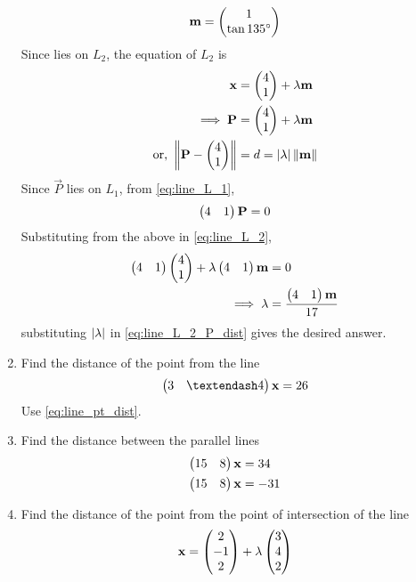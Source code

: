 \documentclass[journal,12pt,twocolumn]{IEEEtran}
\renewcommand\thesection{\arabic{section}}
\begin{document}
\begin{enumerate}[label=\thesection.\arabic*.,ref=\thesection.\theenumi]
\begin{align}
\mathbf{m} = \begin{pmatrix}1 \\ \tan 135\degree\end{pmatrix}
\end{align}
%
Since  lies on $L_2$, the equation of $L_2$ is 
\begin{align}
\label{eq:line_L_2}
\vec{x} &= \myvec{4\\1} + \lambda \vec{m} 
\\
\label{eq:line_L_2_P}
\implies \vec{P} &= \myvec{4\\1} + \lambda \vec{m} 
\\
\label{eq:line_L_2_P_dist}
\text{or, } \norm{\vec{P} - \myvec{4\\1}} &= d = \abs{\lambda}\norm{\vec{m} }
%
\end{align}
%
Since $\vec{P}$ lies on $L_1$, from \eqref{eq:line_L_1},
%
\begin{align}
\begin{pmatrix}4 & 1\end{pmatrix}\mathbf{P}  = 0
\end{align}
%
Substituting from the above in \eqref{eq:line_L_2},
%
\begin{align}
\begin{pmatrix}4 & 1\end{pmatrix}\begin{pmatrix}4\\1\end{pmatrix} + \lambda \begin{pmatrix}4 & 1\end{pmatrix}\mathbf{m}  &= 0
\\
\implies \lambda &= \frac{\begin{pmatrix}4 & 1\end{pmatrix}\mathbf{m}}{17}
\end{align}
%
substituting $\left\vert\lambda\right\vert$ in \eqref{eq:line_L_2_P_dist} gives the desired answer.
\item Find the distance of the point  from the line 
\begin{align}
\myvec{3 & – 4}\vec{x}  = 26
\end{align}
%
\solution Use \eqref{eq:line_pt_dist}.
\item Find the distance between the parallel lines
%
\begin{align}
\begin{pmatrix}15 & 8\end{pmatrix}\mathbf{x} &= 34
\\
\begin{pmatrix}15 & 8\end{pmatrix}\mathbf{x} &= -31
\end{align}
%
\solution
%
\item Find the distance of the point  from the point of intersection of the line
%
\begin{align}
\vec{x} = \myvec{2 \\ -1 \\ 2} + \lambda \myvec{3 \\ 4 \\ 2}  

\end{align}
\end{enumerate}
\end{document}
